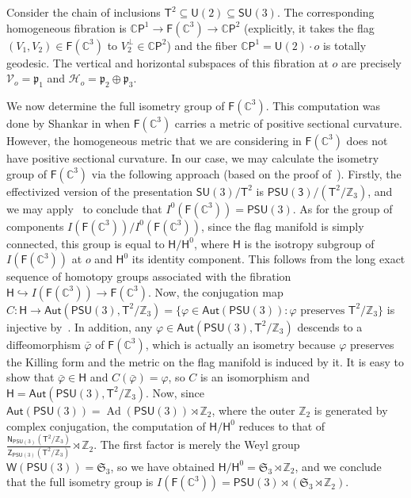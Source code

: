 \documentclass[11pt,a4paper,final]{amsart}
\newcommand{\s}{\mathsf}
\newcommand{\g}{\mathfrak}
\newcommand{\Ad}{\operatorname{Ad}}
\newcommand{\C}{\mathbb{C}}
\theoremstyle{definition}
\begin{document}
Consider the chain of inclusions $\mathsf{T}^2\subseteq \mathsf{U}(2)\subseteq\mathsf{SU}(3)$.
The corresponding homogeneous fibration is $\C\mathsf{P}^{1}\to\mathsf{F}(\C^{3})\to\C\mathsf{P}^{2}$ (explicitly, it takes the flag $(V_1,V_2)\in\s{F}(\C^{3})$ to $V_2^\perp\in\C\s{P}^{2}$) and the fiber $\C\mathsf{P}^{1}=\mathsf{U}(2)\cdot o$ is totally geodesic.
The vertical and horizontal subspaces of this fibration at $o$ are precisely $\mathcal{V}_{o}=\g{p}_{1}$ and $\mathcal{H}_{o}=\g{p}_{2}\oplus\g{p}_{3}$.
		
We now determine the full isometry group of $\s{F}(\C^{3})$.
This computation was done by Shankar in \cite{ShankarIsometryGroups} when $\s{F}(\C^{3})$ carries a metric of positive sectional curvature. However, the homogeneous metric that we are considering in $\s{F}(\C^{3})$ does not have positive sectional curvature. In our case, we may calculate the isometry group of $\s{F}(\C^{3})$ via the following approach (based on the proof of~\cite[\S4, Proposition~6 and \S16, Theorem~3]{Onishchik}).
Firstly, the effectivized version of the presentation $\s{SU}(3)/\s{T}^2$ is $\s{PSU(3)}/(\s{T}^2/\mathbb{Z}_{3})$, and we may apply~\cite[Theorem~5.1]{WangZiller} to conclude that $I^{0}(\s{F}(\C^{3}))=\s{PSU}(3)$.
As for the group of components $I(\s{F}(\C^{3}))/I^{0}(\s{F}(\C^{3}))$, since the flag manifold is simply connected, this group is equal to $\s{H}/\s{H}^{0}$, where $\s{H}$ is the isotropy subgroup of $I(\s{F}(\C^{3}))$ at $o$ and $\s{H}^{0}$ its identity component.
This follows from the long exact sequence of homotopy groups associated with the fibration $\s{H}\hookrightarrow I(\s{F}(\C^{3}))\to\s{F}(\C^{3})$.
Now,  the conjugation map $C\colon \s{H}\to\s{Aut}(\s{PSU}(3),\s{T}^2/\mathbb{Z}_{3})=\{\varphi\in\s{Aut}(\s{PSU}(3)): \varphi \text{ preserves } \s{T}^2/\mathbb{Z}_{3}\}$ is injective by~\cite[Proposition~1.7]{ShankarIsometryGroups}.
In addition, any $\varphi\in\s{Aut}(\s{PSU}(3),\s{T}^2/\mathbb{Z}_{3})$ descends to a diffeomorphism $\bar{\varphi}$ of $\s{F}(\C^{3})$, which is actually an isometry because $\varphi$ preserves the Killing form and the metric on the flag manifold is induced by it.
It is easy to show that $\bar{\varphi}\in\s{H}$ and $C(\bar{\varphi})=\varphi$, so $C$ is an isomorphism and $\s{H}=\s{Aut}(\s{PSU}(3),\s{T}^2/\mathbb{Z}_{3})$.
Now, since $\s{Aut}(\s{PSU}(3))=\Ad(\s{PSU}(3))\rtimes\mathbb{Z}_{2}$, where the outer $\mathbb{Z}_{2}$ is generated by complex conjugation, the computation of $\s{H}/\s{H}^{0}$ reduces to that of $\frac{\s{N}_{\s{PSU}(3)}(\s{T}^2/\mathbb{Z}_{3})}{\s{Z}_{\s{PSU}(3)}(\s{T}^2/\mathbb{Z}_{3})}\rtimes \mathbb{Z}_{2}$.
The first factor is merely the Weyl group $\s{W}(\s{PSU}(3))=\g{S}_{3}$, so we have obtained $\s{H}/\s{H}^{0}=\g{S}_{3}\rtimes\mathbb{Z}_{2}$, and we conclude that the full isometry group is $I(\mathsf{F}(\C^{3}))=\mathsf{PSU}(3)\rtimes (\g{S}_{3}\rtimes\mathbb{Z}_{2})$.
	
\end{document}
